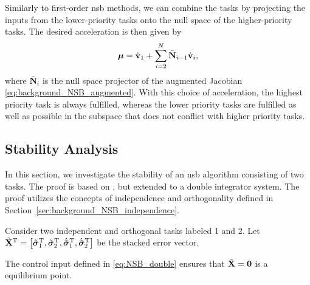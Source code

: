 Similarly to first-order \gls{nsb} methods, we can combine the tasks by projecting the inputs from the lower-priority tasks onto the null space of the higher-priority tasks.
The desired acceleration is then given by
\begin{equation}
    \bm{\mu} = \dot{\mathbf{v}}_1 + \sum_{i=2}^N \bar{\mathbf{N}}_{i-1}\dot{\mathbf{v}}_i,
    \label{eq:NSB_double}
\end{equation}
where $\bar{\mathbf{N}}_i$ is the null space projector of the augmented Jacobian \eqref{eq:background_NSB_augmented}.
With this choice of acceleration, the highest priority task is always fulfilled, whereas the lower priority tasks are fulfilled as well as possible in the subspace that does not conflict with higher priority tasks.

\subsection{Stability Analysis}
In this section, we investigate the stability of an \gls{nsb} algorithm consisting of two tasks.
The proof is based on \cite{antonelli_stability_2008}, but extended to a double integrator system.
The proof utilizes the concepts of independence and orthogonality defined in Section~\ref{sec:background_NSB_independence}.

\begin{lemma}\label{theorem:one}
    Consider two independent and orthogonal tasks labeled 1 and 2.
    Let
    $
        \Tilde{\mathbf{X}}^{\mathrm{T}} = \left[\Tilde{\bm{\sigma}}_1^{\mathrm{T}}, \Tilde{\bm{\sigma}}_2^{\mathrm{T}}, \dot{\Tilde{\bm{\sigma}}}_1^{\mathrm{T}}, \dot{\Tilde{\bm{\sigma}}}_2^{\mathrm{T}} \right]
    $
    be the stacked error vector.

    The control input defined in \eqref{eq:NSB_double} ensures that $\Tilde{\mathbf{X}} = \mathbf{0}$ is a  equilibrium point.
\end{lemma}

